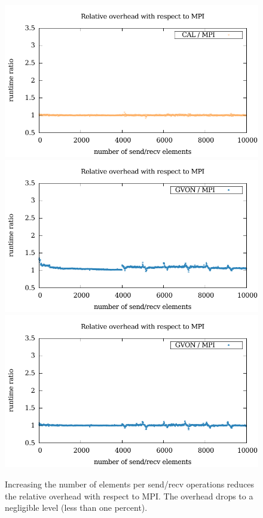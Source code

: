 \begin{figure}[H]
\begin{minipage}[t]{0.5\textwidth}
  \end{minipage}%
  \begin{minipage}[t]{0.5\textwidth}
    \includegraphics[width=\textwidth]{plots/50_nsize_overhead_cal_laser}
    \includegraphics[width=\textwidth]{plots/50_nsize_overhead_gvon_laser}
    \includegraphics[width=\textwidth]{plots/50_nsize_one_lookup_overhead_gvon_laser}
  \end{minipage}%
  \caption{Increasing the number of elements per send/recv operations
    reduces the relative overhead with respect to MPI. The overhead
    drops to a negligible level (less than one percent).}
  \label{fig:nsize_kepler}
\end{figure}

